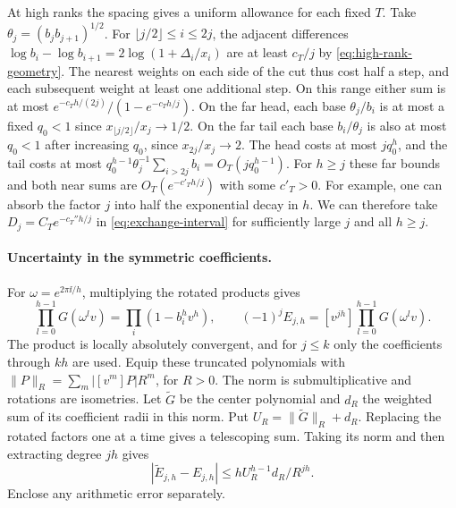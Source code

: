 At high ranks the spacing gives a uniform allowance for each fixed
\(T\). Take \(\theta_j=(b_j b_{j+1})^{1/2}\).
For \(\lfloor j/2\rfloor\le i\le 2j\), the adjacent differences
\(\log b_i-\log b_{i+1}=2\log(1+\Delta_i/x_i)\) are at least
\(c_T/j\) by \eqref{eq:high-rank-geometry}. The nearest weights on
each side of the cut thus cost half a step, and each subsequent
weight at least one additional step. On this range either sum is at
most \(e^{-c_T h/(2j)}/(1-e^{-c_T h/j})\).
On the far head, each base \(\theta_j/b_i\) is at most a fixed
\(q_0<1\) since \(x_{\lfloor j/2\rfloor}/x_j\to1/2\).
On the far tail each base \(b_i/\theta_j\) is also at most
\(q_0<1\) after increasing \(q_0\), since \(x_{2j}/x_j\to2\).
The head costs at most \(j q_0^h\), and the tail costs at most
\(q_0^{h-1}\theta_j^{-1}\sum_{i>2j}b_i=O_T(jq_0^{h-1})\).
For \(h\ge j\) these far bounds and both near sums are
\(O_T(e^{-c'_T h/j})\) with some \(c'_T>0\). For example,
one can absorb the factor \(j\) into half the exponential decay
in \(h\). We can therefore take \(D_j=C_Te^{-c_T'' h/j}\)
in \eqref{eq:exchange-interval} for sufficiently large \(j\)
and all \(h\ge j\).

\paragraph{Uncertainty in the symmetric coefficients.}
For \(\omega=e^{2\pi\ii/h}\), multiplying the rotated products gives
\[
 \prod_{l=0}^{h-1}G(\omega^l v)=\prod_i(1-b_i^h v^h),
 \qquad
 (-1)^j E_{j,h}=[v^{jh}]\prod_{l=0}^{h-1}G(\omega^l v).
\]
The product is locally absolutely convergent, and for \(j\le k\)
only the coefficients through \(kh\) are used. Equip these
truncated polynomials with
\(\|P\|_R=\sum_m |[v^m]P|R^m\), for \(R>0\).
The norm is submultiplicative and rotations are isometries.
Let \(\widetilde G\) be the center polynomial and \(d_R\) the
weighted sum of its coefficient radii in this norm. Put
\(U_R=\|\widetilde G\|_R+d_R\). Replacing the rotated factors
one at a time gives a telescoping sum. Taking its norm and then
extracting degree \(jh\) gives
\begin{equation}\label{eq:exchange-coefficient-error}
 |\widetilde E_{j,h}-E_{j,h}|
 \le h U_R^{h-1}d_R/R^{jh}.
\end{equation}
Enclose any arithmetic error separately.

